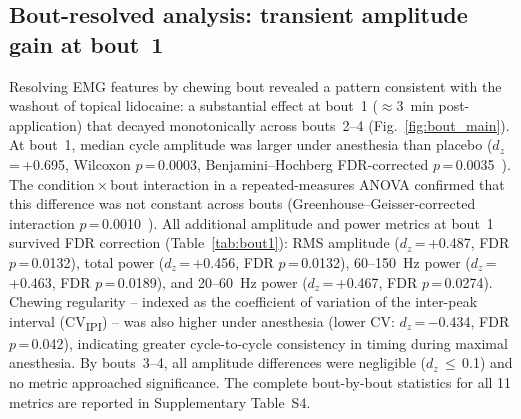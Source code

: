 \subsection*{Bout-resolved analysis: transient amplitude gain at bout~1}

Resolving EMG features by chewing bout revealed a pattern consistent with
the washout of topical lidocaine: a substantial effect at bout~1 ($\approx$3~min
post-application) that decayed monotonically across bouts~2--4
(Fig.~\ref{fig:bout_main}).
At bout~1, median cycle amplitude was larger under anesthesia than placebo
($d_z$\,=\,+0.695, Wilcoxon $p$\,=\,0.0003, Benjamini--Hochberg FDR-corrected
$p$\,=\,0.0035~\cite{Benjamini1995}).
The condition\,$\times$\,bout interaction in a repeated-measures ANOVA
confirmed that this difference was not constant across bouts
(Greenhouse--Geisser-corrected interaction $p$\,=\,0.0010~\cite{Pingouin}).
All additional amplitude and power metrics at bout~1 survived FDR correction
(Table~\ref{tab:bout1}): RMS amplitude ($d_z$\,=\,+0.487,
FDR $p$\,=\,0.0132), total power ($d_z$\,=\,+0.456, FDR $p$\,=\,0.0132),
60--150~Hz power ($d_z$\,=\,+0.463, FDR $p$\,=\,0.0189), and 20--60~Hz power
($d_z$\,=\,+0.467, FDR $p$\,=\,0.0274).
Chewing regularity -- indexed as the coefficient of variation of the inter-peak
interval (CV\textsubscript{IPI}) -- was also higher under anesthesia
(lower CV: $d_z$\,=\,$-$0.434, FDR $p$\,=\,0.042), indicating greater
cycle-to-cycle consistency in timing during maximal anesthesia.
By bouts~3--4, all amplitude differences were negligible
($d_z$\,$\leq$\,0.1) and no metric approached significance.
The complete bout-by-bout statistics for all 11 metrics are reported in
Supplementary Table~S4.

